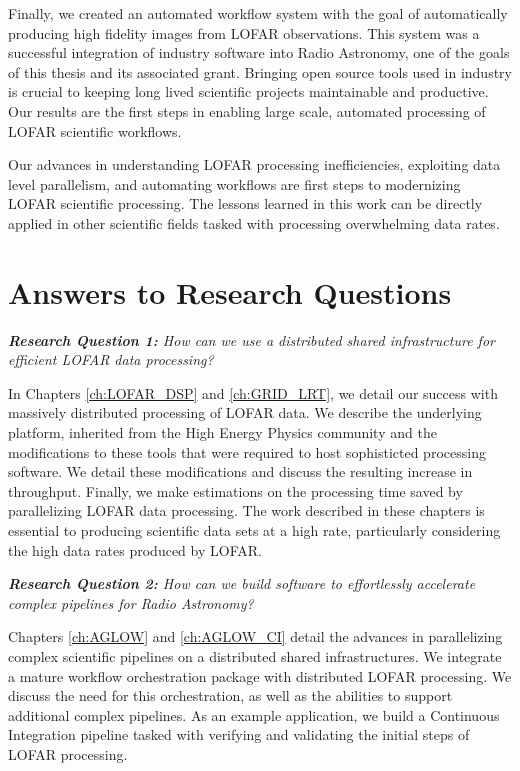 Finally, we created an automated workflow system with the goal of automatically producing high fidelity images from LOFAR observations. This system was a successful integration of industry software into Radio Astronomy, one of the goals of this thesis and its associated grant. Bringing open source tools used in industry is crucial to  keeping long lived scientific projects  maintainable and productive. Our results are the first steps in enabling large scale, automated processing of LOFAR scientific workflows.  

Our advances in understanding LOFAR processing inefficiencies, exploiting data level parallelism, and automating workflows are first steps to modernizing LOFAR scientific processing. The lessons learned in this work can be directly applied in other scientific fields tasked with  processing overwhelming data rates.  

\section{Answers to Research Questions}


\begin{addmargin}[4em]{8em}%
    \emph{\textbf{Research Question 1:} How can we use a distributed shared infrastructure for efficient LOFAR data processing?}
\end{addmargin}

In Chapters \ref{ch:LOFAR_DSP} and \ref{ch:GRID_LRT}, we detail our success with massively distributed processing of LOFAR data. We describe the underlying platform, inherited from the High Energy Physics community and the modifications to these tools that were required to host sophisticted processing software. We detail these modifications and discuss the resulting increase in throughput. Finally, we make estimations on the processing time saved by parallelizing LOFAR data processing. The work described in these chapters is essential to producing scientific data sets at a high rate, particularly considering the high data rates produced by LOFAR.  


\begin{addmargin}[4em]{8em}%
    \emph{\textbf{Research Question 2:}  How can we build software to effortlessly accelerate complex pipelines for Radio Astronomy?} 
\end{addmargin}

Chapters \ref{ch:AGLOW} and \ref{ch:AGLOW_CI} detail the advances in parallelizing complex scientific pipelines on a distributed shared infrastructures. We integrate a mature workflow orchestration package with distributed LOFAR processing. We discuss the need for this orchestration, as well as the abilities to support additional complex pipelines. As an example application, we build a Continuous Integration pipeline tasked with verifying and validating the initial steps of LOFAR processing. 


